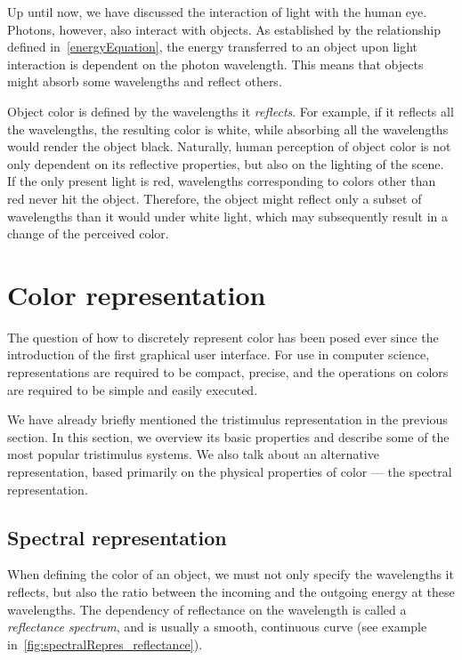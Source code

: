 Up until now, we have discussed the interaction of light with the human eye. Photons, however, also interact with objects. As established by the relationship defined in~\cref{energyEquation}, the energy transferred to an object upon light interaction is dependent on the photon wavelength. This means that objects might absorb some wavelengths and reflect others.

Object color is defined by the wavelengths it \emph{reflects}. For example, if it reflects all the wavelengths, the resulting color is white, while absorbing all the wavelengths would render the object black. Naturally, human perception of object color is not only dependent on its reflective properties, but also on the lighting of the scene. If the only present light is red, wavelengths corresponding to colors other than red never hit the object. Therefore, the object might reflect only a subset of wavelengths than it would under white light, which may subsequently result in a change of the perceived color.

\section{Color representation} \label{sec:colorRepresentation}

The question of how to discretely represent color has been posed ever since the introduction of the first graphical user interface. For use in computer science, representations are required to be compact, precise, and the operations on colors are required to be simple and easily executed.

We have already briefly mentioned the tristimulus representation in the previous section. In this section, we overview its basic properties and describe some of the most popular tristimulus systems. We also talk about an alternative representation, based primarily on the physical properties of color --- the spectral representation.

\subsection{Spectral representation}

When defining the color of an object, we must not only specify the wavelengths it reflects, but also the ratio between the incoming and the outgoing energy at these wavelengths. The dependency of reflectance on the wavelength is called a \emph{reflectance spectrum}, and is usually a smooth, continuous curve (see example in~\cref{fig:spectralRepres_reflectance}).

